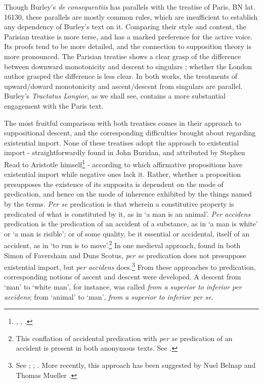 \documentclass[]{birkjour}
\begin{document}
Though Burley's \textit{de consequentiis} has parallels with the treatise of Paris, BN lat. 16130, these parallels are mostly common rules, which are insufficient to establish any dependency of Burley's text on it. Comparing their style and content, the Parisian treatise is more terse, and has a marked preference for the active voice. Its proofs tend to be more detailed, and the connection to supposition theory is more pronounced. The Parisian treatise shows a clear grasp of the difference between downward monotonicity and descent to singulars \autocite[p. 12, par. 2]{Green-Pedersen1980a}; whether the London author grasped the difference is less clear. In both works, the treatments of upward/doward monotonicity and ascent/descent from singulars are parallel. Burley's \textit{Tractatus Longior}, as we shall see, contains a more substantial engagement with the Paris text.

The most fruitful comparison with both treatises comes in their approach to suppositional descent, and the corresponding difficulties brought about regarding existential import. None of these treatises adopt the approach to existential import - straightforwardly found in John Buridan, and  attributed by Stephen Read to Aristotle himself\footnote{\autocite[q. I. 38]{BuridanPostAn}, \autocite{Klima2001}, \autocite{Read2015b}.} - according to which affirmative propositions have existential import while negative ones lack it. Rather, whether a proposition presupposes the existence of its supposita is dependent on the mode of predication, and hence on the mode of inherence exhibited by the things named by the terms. \textit{Per se} predication is that wherein a constitutive property is predicated of what is constituted by it, as in `a man is an animal'. \textit{Per accidens} predication is the predication of an accident of a substance, as in `a man is white' or `a man is risible'; or of some quality, be it essential or accidental, itself of an accident, as in `to run is to move'.\footnote{This conflation of accidental predication with \textit{per se} predication of an accident is present in both anonymous texts. See \autocite[pp. 10-11, par. 35-36; 25, par. 66]{Green-Pedersen1980a}.} In one medieval approach, found in both Simon of Faversham and Duns Scotus, \textit{per se} predication does not presuppose existential import, but \textit{per accidens} does.\footnote{See \autocite[q. I. 56]{FavershamQE}; \autocite[I. qq. 5-8. par. 49, 74]{ScotusPeriHerm}; \autocite[q. 11, par. 19]{ScotusQE}. More recently, this approach has been suggested by Nuel Belnap and Thomas Mueller \autocite{CIFOL1}.} From these approaches to predication, corresponding notions of ascent and descent were developed. A descent from `man' to `white man', for instance, was called \textit{from a superior to inferior per accidens}; from `animal' to `man', \textit{from a superior to inferior per se}. 
\end{document}
